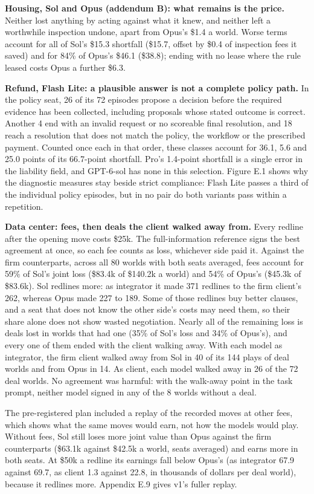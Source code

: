 \textbf{Housing, Sol and Opus (addendum B): what remains is the price.} Neither lost anything by acting against what it
knew, and neither left a worthwhile inspection undone, apart from Opus's \$1.4 a world. Worse terms account for all of
Sol's \$15.3 shortfall (\$15.7, offset by \$0.4 of inspection fees it saved) and for 84\% of Opus's \$46.1 (\$38.8); ending
with no lease where the rule leased costs Opus a further \$6.3.

\textbf{Refund, Flash Lite: a plausible answer is not a complete policy path.} In the policy seat, 26 of its 72 episodes
propose a decision before the required evidence has been collected, including proposals whose stated outcome is
correct. Another 4 end with an invalid request or no scoreable final resolution, and 18 reach a resolution that
does not match the policy, the workflow or the prescribed payment. Counted once each in that order, these classes
account for 36.1, 5.6 and 25.0 points of its 66.7-point shortfall. Pro's 1.4-point shortfall is a single error in the
liability field, and GPT-6-sol has none in this selection. Figure E.1 shows why the diagnostic measures stay beside
strict compliance: Flash Lite passes a third of the individual policy episodes, but in no pair do both variants pass
within a repetition.

\textbf{Data center: fees, then deals the client walked away from.} Every redline after the opening move costs \$25k. The
full-information reference signs the best agreement at once, so each fee counts as loss, whichever side paid it.
Against the firm counterparts, across all 80 worlds with both seats averaged, fees account for 59\% of Sol's joint loss
(\$83.4k of \$140.2k a world) and 54\% of Opus's (\$45.3k of \$83.6k). Sol redlines more: as integrator it made 371
redlines to the firm client's 262, whereas Opus made 227 to 189. Some of those redlines buy better clauses, and a seat
that does not know the other side's costs may need them, so their share alone does not show wasted negotiation. Nearly
all of the remaining loss is deals lost in worlds that had one (35\% of Sol's loss and 34\% of Opus's), and every one of
them ended with the client walking away. With each model as integrator, the firm client walked away from Sol in 40 of
its 144 plays of deal worlds and from Opus in 14. As client, each model walked away in 26 of the 72 deal worlds. No
agreement was harmful: with the walk-away point in the task prompt, neither model signed in any of the 8 worlds
without a deal.

The pre-registered plan included a replay of the recorded moves at other fees, which shows what the same moves would
earn, not how the models would play. Without fees, Sol still loses more joint value than Opus against the firm
counterparts (\$63.1k against \$42.5k a world, seats averaged) and earns more in both seats. At \$50k a redline its
earnings fall below Opus's (as integrator 67.9 against 69.7, as client 1.3 against 22.8, in thousands of dollars per
deal world), because it redlines more. Appendix E.9 gives v1's fuller replay.

